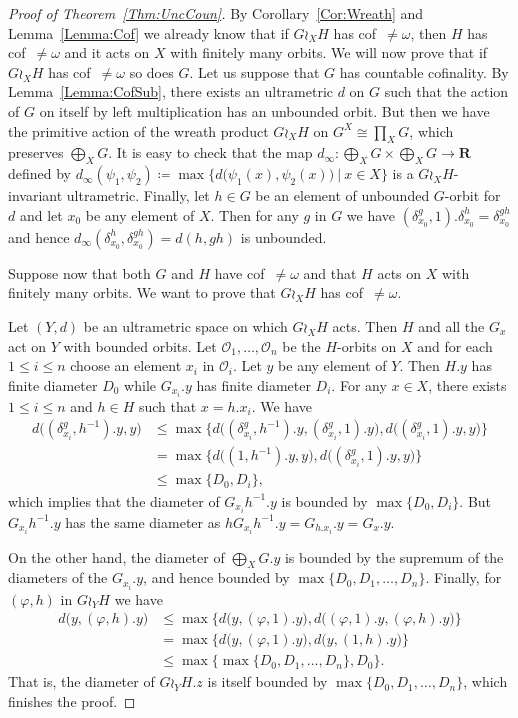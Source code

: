 \documentclass[a4paper]{article}
\theoremstyle{definition}
\newcommand*{\field}[1]{\mathbf{#1}}
\newcommand*{\R}{\field{R}}
\newcommand{\setst}[2]{\{#1\ |\ #2\}}
\begin{document}
\begin{proof}[Proof of Theorem~\ref{Thm:UncCoun}]
By Corollary~\ref{Cor:Wreath} and Lemma~\ref{Lemma:Cof} we already know that if $G \wr_X H$ has cof~$\neq\omega$, then $H$ has cof~$\neq\omega$ and it acts on $X$ with finitely many orbits.
We will now prove that if $G \wr_X H$ has cof~$\neq\omega$ so does $G$.
Let us suppose that $G$ has countable cofinality. By Lemma~\ref{Lemma:CofSub}, there exists an ultrametric $d$ on $G$ such that the action of $G$ on itself by left multiplication has an unbounded orbit.
But then we have the primitive action of the wreath product $G\wr_XH$ on $G^X\cong\prod_XG$, which preserves $\bigoplus_XG$.
It is easy to check that the map $d_\infty\colon\bigoplus_XG\times\bigoplus_XG\to\R$ defined by $d_\infty(\psi_1,\psi_2)\coloneqq\max\setst{d\bigl(\psi_1(x),\psi_2(x)\bigr)}{x\in X}$ is a $G\wr_XH$-invariant ultrametric.
Finally, let $h\in G$ be an element of unbounded $G$-orbit for $d$ and let $x_0$ be any element of $X$. Then for any $g$ in $G$ we have $(\delta_{x_0}^g,1).\delta_{x_0}^h=\delta_{x_0}^{gh}$ and hence $d_\infty(\delta_{x_0}^h,\delta_{x_0}^{gh})=d(h,gh)$ is unbounded.

Suppose now that both $G$ and $H$ have cof~$\neq\omega$ and that $H$ acts on $X$ with finitely many orbits. We want to prove that $G\wr_XH$ has cof~$\neq\omega$.

Let $(Y,d)$ be an ultrametric space on which $G\wr_XH$ acts.
Then $H$ and all the $G_x$ act on $Y$ with bounded orbits.
Let $\mathcal O_1,\dots,\mathcal O_n$ be the $H$-orbits on $X$ and for each $1\leq i\leq n$ choose an element $x_i$ in $\mathcal O_i$.
Let $y$ be any element of $Y$.
Then $H.y$ has finite diameter $D_0$ while $G_{x_i}.y$ has finite diameter $D_i$.
For any $x\in X$, there exists $1\leq i\leq n$ and $h\in H$ such that $x=h.x_i$.
We have
\begin{align*}
	d\bigl((\delta_{x_i}^g,h^{-1}).y,y\bigr)&\leq\max\{d\bigl((\delta_{x_i}^g,h^{-1}).y,(\delta_{x_i}^g,1).y\bigr),d\bigl((\delta_{x_i}^g,1).y,y\bigr)\}\\
	&=\max\{d\bigl((1,h^{-1}).y,y\bigr),d\bigl((\delta_{x_i}^g,1).y,y\bigr)\}\\
	&\leq \max\{D_0,D_i\},
\end{align*}
which implies that the diameter of $G_{x_i}h^{-1}.y$ is bounded by $\max\{D_0,D_i\}$.
But $G_{x_i}h^{-1}.y$ has the same diameter as $hG_{x_i}h^{-1}.y=G_{h.x_i}.y=G_x.y$.

On the other hand, the diameter of $\bigoplus_XG.y$ is bounded by the supremum of the diameters of the $G_{x_i}.y$, and hence bounded by $\max\{D_0,D_1,\dots,D_n\}$.
Finally, for $(\varphi,h)$ in $G\wr_YH$ we have
\begin{align*}
	d\bigl(y,(\varphi,h).y\bigr)&\leq\max\{d\bigl(y,(\varphi,1).y\bigr),d\bigl((\varphi,1).y,(\varphi,h).y\bigr)\}\\
	&=\max\{d\bigl(y,(\varphi,1).y\bigr),d\bigl(y,(1,h).y\bigr)\}\\
	&\leq\max\{\max\{D_0,D_1,\dots,D_n\},D_0\}.
\end{align*}
That is, the diameter of $G\wr_YH.z$ is itself bounded by $\max\{D_0,D_1,\dots,D_n\}$, which finishes the proof.
\end{proof}
\end{document}
